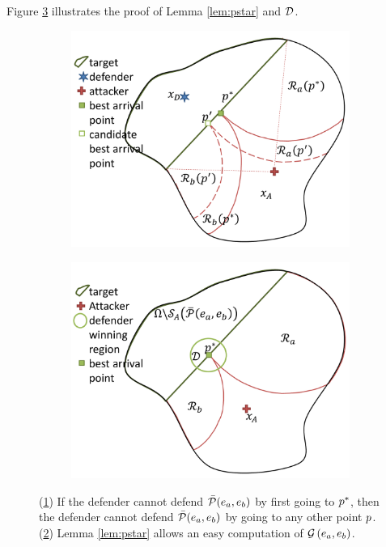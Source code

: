 Figure \ref{fig:lemma2} illustrates the proof of Lemma \ref{lem:pstar} and $\mathcal{D}$.
\begin{figure}[h]
\centering
	\centering
	\begin{subfigure}{0.3\textwidth}
	\includegraphics[width=\textwidth]{"fig/best point pstar"}
	\caption{\label{subfig:pstar}}
	\end{subfigure}
	\begin{subfigure}{0.3\textwidth}
	\centering
	\includegraphics[width=\textwidth]{"fig/defender winning pd"}
	\caption{\label{subfig:dregion}}
	\end{subfigure}
	\caption{(\ref{subfig:pstar}) If the defender cannot defend $\bar{\mathcal{P}}(e_a,e_b)$ by first going to $p^*$, then the defender cannot defend $\bar{\mathcal{P}}(e_a,e_b)$ by going to any other point $p$. (\ref{subfig:dregion}) Lemma \ref{lem:pstar} allows an easy computation of $\mathcal{G}\left(e_a,e_b\right)$.}
	\label{fig:lemma2}
\end{figure}


